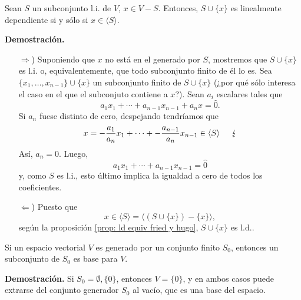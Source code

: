 \begin{lema}
	\label{lema: S union x es ld sii x en generado de S}
Sean $S$ un subconjunto l.i. de $V$, $x \in V - S$.
Entonces, $S \cup \{ x \}$ es linealmente dependiente si y sólo
si $x \in \langle S \rangle$.
\end{lema}
\noindent
\textbf{Demostración.}
\begin{itemize}
	\item[$\Rightarrow$)] Suponiendo que $x$ no está en el generado por
	$S$, mostremos que $S \cup \{ x \} $ es l.i. o, equivalentemente,
	que todo subconjunto finito de él lo es. Sea 
	$\{ x_{1}, \ldots , x_{n-1} \} \cup \{ x \}$
	un subconjunto finito de $S \cup \{ x \}$ (¿por qué sólo interesa
	el caso en el que el subconjuto contiene a $x$?). Sean 
	$a_{i}$ escalares tales que 
	\[
	a_{1} x_{1} + \cdots + a_{n-1}x_{n-1} + a_{n}x = \hat{0}.
	\]
	Si $a_{n}$ fuese distinto de cero, despejando tendríamos que
	\[
	x = -\frac{a_{1}}{a_{n}}x_{1} + \cdots + -\frac{a_{n-1}}{a_{n}}x_{n-1}
	\in \langle S \rangle \hspace{0.5cm} \lightning
	\]
	Así, $a_{n} = 0$. Luego,
	\[
	a_{1} x_{1} + \cdots + a_{n-1}x_{n-1} = \hat{0}
	\]
	y, como $S$ es l.i., esto último implica la igualdad a cero 
	de todos los coeficientes.
	\item[$\Leftarrow$)] Puesto que
	\[
	x \in \langle S \rangle = \langle (S \cup \{ x \}) - \{ x \} \rangle,
	\]
	según la proposición \ref{prop: ld equiv fried y hugo},
	$S \cup \{ x \}$ es l.d..
\end{itemize}

\QEDB
\vspace{0.2cm}

\begin{teo}
	\label{teo: extrayendo bases de generadores finitos}
 Si un espacio vectorial $V$ es generado
por un conjunto finito $S_{0}$, entonces un subconjunto de $S_{0}$
es base para $V$.
\end{teo}
\noindent
\textbf{Demostración.}
Si $S_{0} = \emptyset, \{ 0 \}$, entonces $V = \{ 0 \}$, y en ambos
casos puede extrarse del conjunto generador $S_{0}$ al vacío,
que es una base del espacio.

